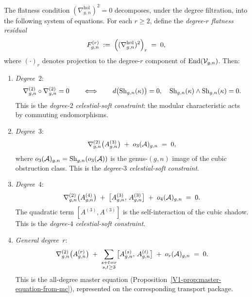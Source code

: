 \begin{theorem}
\label{thm:thqg-VI-flatness-by-degree}
The flatness condition
$(\nabla^{\mathrm{hol}}_{g,n})^2 = 0$
decomposes, under the degree filtration, into the following
system of equations. For each $r \geq 2$, define the
\emph{degree-$r$ flatness residual}
\begin{equation}%
F^{(r)}_{g,n}
\;:=\;
\Bigl(
(\nabla^{\mathrm{hol}}_{g,n})^2
\Bigr)_{r}
\;=\; 0,
\end{equation}
where $(\cdot)_r$ denotes projection to the degree-$r$ component
of $\operatorname{End}(\mathcal{V}_{g,n})$. Then:
\begin{enumerate}[label=\textup{(\alph*)}]
\item \emph{Degree~$2$}:
\begin{equation}%
\nabla^{(2)}_{g,n} \circ \nabla^{(2)}_{g,n} = 0
\qquad\Longleftrightarrow\qquad
d\bigl(\Sh_{g,n}(\kappa)\bigr) = 0,
\quad
\Sh_{g,n}(\kappa) \wedge \Sh_{g,n}(\kappa) = 0.
\end{equation}
This is the \emph{degree-$2$ celestial-soft constraint}: the modular
characteristic acts by commuting endomorphisms.
\item \emph{Degree~$3$}:
\begin{equation}%
\nabla^{(2)}_{g,n}\bigl(A^{(3)}_{g,n}\bigr)
\;+\;
o_3(\cA)_{g,n}
\;=\; 0,
\end{equation}
where $o_3(\mathcal{A})_{g,n} = \operatorname{Sh}_{g,n}(o_3(\mathcal{A}))$ is the genus-$(g,n)$
image of the cubic obstruction class. This is the
\emph{degree-$3$ celestial-soft constraint}.
\item \emph{Degree~$4$}:
\begin{equation}%
\nabla^{(2)}_{g,n}\bigl(A^{(4)}_{g,n}\bigr)
\;+\;
\bigl[A^{(3)}_{g,n},\, A^{(3)}_{g,n}\bigr]
\;+\;
o_4(\cA)_{g,n}
\;=\; 0.
\end{equation}
The quadratic term $[A^{(3)}, A^{(3)}]$ is the self-interaction
of the cubic shadow. This is the \emph{degree-$4$ celestial-soft
constraint}.
\item \emph{General degree~$r$}:
\begin{equation}%
\nabla^{(2)}_{g,n}\bigl(A^{(r)}_{g,n}\bigr)
\;+\;
\sum_{\substack{s+t = r \\ s,t \geq 3}}
\bigl[A^{(s)}_{g,n},\, A^{(t)}_{g,n}\bigr]
\;+\;
o_r(\cA)_{g,n}
\;=\; 0.
\end{equation}
This is the all-degree master equation
(Proposition~\ref{V1-prop:master-equation-from-mc}), represented on
the corresponding transport package.
\end{enumerate}
\end{theorem}

